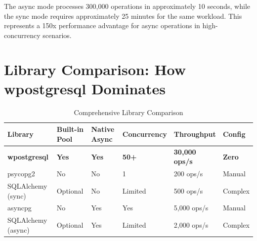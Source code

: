 \documentclass[12pt,a4paper]{report}
\begin{document}
The async mode processes 300,000 operations in approximately 10 seconds, while the sync mode requires approximately 25 minutes for the same workload. This represents a 150x performance advantage for async operations in high-concurrency scenarios.

\section{Library Comparison: How wpostgresql Dominates}

\begin{table}[H]
	\centering
	\caption{Comprehensive Library Comparison}
	\begin{tabular}{@{}llllll@{}}
		\toprule
		\textbf{Library}     & \textbf{Built-in Pool}                  & \textbf{Native Async}                   & \textbf{Concurrency}                    & \textbf{Throughput}                              & \textbf{Config}                          \\
		\midrule
		\textbf{wpostgresql} & \textcolor{blue!70!black}{\textbf{Yes}} & \textcolor{blue!70!black}{\textbf{Yes}} & \textcolor{blue!70!black}{\textbf{50+}} & \textcolor{blue!70!black}{\textbf{30,000 ops/s}} & \textcolor{blue!70!black}{\textbf{Zero}} \\
		psycopg2             & No                                      & No                                      & 1                                       & 200 ops/s                                        & Manual                                   \\
		SQLAlchemy (sync)    & Optional                                & No                                      & Limited                                 & 500 ops/s                                        & Complex                                  \\
		asyncpg              & No                                      & Yes                                     & Yes                                     & 5,000 ops/s                                      & Manual                                   \\
		SQLAlchemy (async)   & Optional                                & Yes                                     & Limited                                 & 2,000 ops/s                                      & Complex                                  \\
		\bottomrule
	\end{tabular}
\end{table}
\end{document}
